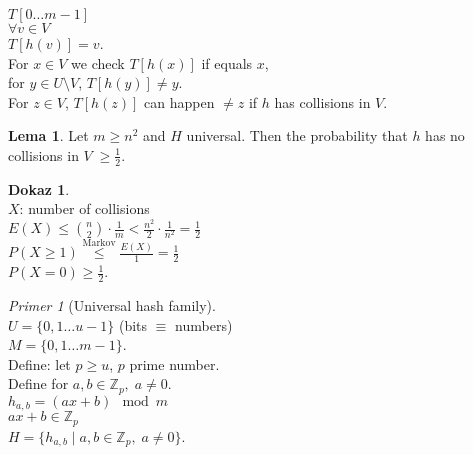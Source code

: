 \documentclass[a4paper, 12pt]{book}
\theoremstyle{definition}
\newtheorem{lemma}[counter]{Lema}
\newtheorem{pro}[counter]{Dokaz}
\theoremstyle{remark}
\newtheorem*{ex}{Primer}
\newcommand{\Z}{\mathbb{Z}}
\begin{document}
$T[0 \dots m-1]$ \\
$\forall v \in V$ \\
$T[h(v)] = v$. \\
For $x \in V$ we check $T[h(x)]$ if equals $x$, \\
for $y \in U \setminus V$, $T[h(y)] \neq y$. \\
For $z \in V$, $T[h(z)]$ can happen $\neq z$ if $h$ has collisions in $V$.
\begin{lemma}
  Let $m \geq n^2$ and $H$ universal.
  Then the probability that $h$ has no collisions in $V \; \geq \frac{1}{2}$.
\end{lemma}
\begin{pro} \text{} \\
  $X$: number of collisions \\
  $E(X) \leq \binom{n}{2} \cdot \frac{1}{m} < \frac{n^2}{2} \cdot \frac{1}{n^2} = \frac{1}{2}$ \\
  $P(X \geq 1) \stackrel{\text{Markov}}{\leq} \frac{E(X)}{1} = \frac{1}{2}$ \\
  $P(X = 0) \geq \frac{1}{2}$.
\end{pro}
\begin{ex}[Universal hash family] \text{} \\
  $U = \{0, 1 \dots u-1\}$ (bits $\equiv$ numbers) \\
  $M = \{0, 1 \dots m-1\}$. \\
  Define: let $p \geq u$, $p$ prime number. \\
  Define for $a, b \in \Z_p, \; a \neq 0$. \\
  $h_{a,b} = (ax + b) \mod m$ \\
  $ax + b \in \Z_p$ \\
  $H = \{h_{a,b} \mid a, b \in \Z_p, \; a \neq 0\}$.
\end{ex}
\end{document}
